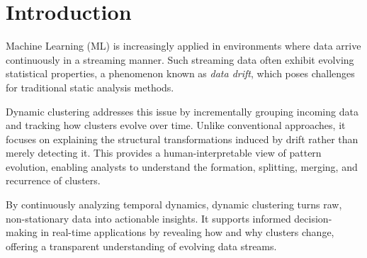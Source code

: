 \section{Introduction}\label{ch:introduction}

Machine Learning (ML) is increasingly applied in environments where data arrive
continuously in a streaming manner. Such streaming data often exhibit evolving
statistical properties, a phenomenon known as \emph{data drift}, which poses
challenges for traditional static analysis methods.

Dynamic clustering addresses this issue by incrementally grouping incoming data
and tracking how clusters evolve over time. Unlike conventional approaches, it
focuses on explaining the structural transformations induced by drift rather
than merely detecting it. This provides a human-interpretable view of pattern
evolution, enabling analysts to understand the formation, splitting, merging,
and recurrence of clusters.

By continuously analyzing temporal dynamics, dynamic clustering turns raw,
non-stationary data into actionable insights. It supports informed
decision-making in real-time applications by revealing how and why clusters
change, offering a transparent understanding of evolving data streams.
